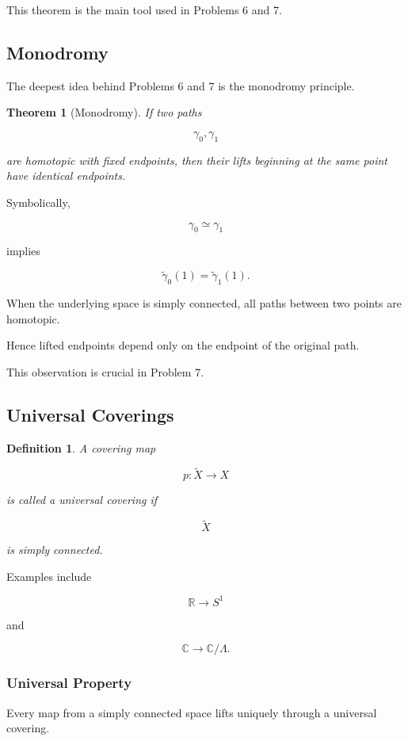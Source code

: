 \documentclass[12pt,a4paper]{article}
\newtheorem{theorem}{Theorem}[section]
\theoremstyle{notespace}
\newtheorem{definition}{Definition}[subsection]
\begin{document}
This theorem is the main tool used in Problems 6 and 7.

\subsection{Monodromy}

The deepest idea behind Problems 6 and 7 is the monodromy principle.

\begin{theorem}[Monodromy]
	If two paths
	
	\[
	\gamma_0,\gamma_1
	\]
	
	are homotopic with fixed endpoints, then their lifts beginning at the same point have identical endpoints.
\end{theorem}

Symbolically,

\[
\gamma_0\simeq\gamma_1
\]

implies

\[
\widetilde\gamma_0(1)
=
\widetilde\gamma_1(1).
\]

When the underlying space is simply connected, all paths between two points are homotopic.

Hence lifted endpoints depend only on the endpoint of the original path.

This observation is crucial in Problem 7.

\subsection{Universal Coverings}

\begin{definition}
	A covering map
	
	\[
	p:\widetilde X\to X
	\]
	
	is called a \emph{universal covering} if
	
	\[
	\widetilde X
	\]
	
	is simply connected.
\end{definition}

Examples include

\[
\mathbb R\to S^1
\]

and

\[
\mathbb C\to\mathbb C/\Lambda.
\]

\subsubsection*{Universal Property}

Every map from a simply connected space lifts uniquely through a universal covering.
\end{document}
